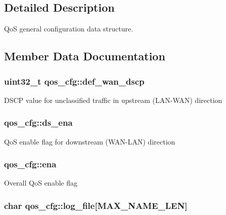 \subsection{Detailed Description}
Qo\-S general configuration data structure. 

\subsection{Member Data Documentation}
\hypertarget{structqos__cfg_aca196127a157dc22a75c9fc1a9abb124}{
\subsubsection[{def\-\_\-wan\-\_\-dscp}]{\setlength{\rightskip}{0pt plus 5cm}uint32\-\_\-t qos\-\_\-cfg\-::def\-\_\-wan\-\_\-dscp}}\label{structqos__cfg_aca196127a157dc22a75c9fc1a9abb124}
D\-S\-C\-P value for unclassified traffic in upstream (L\-A\-N-\/\-W\-A\-N) direction \hypertarget{structqos__cfg_a59c290fbf8b95e2f08674c8d3565531d}{
\subsubsection[{ds\-\_\-ena}]{ qos\-\_\-cfg\-::ds\-\_\-ena}}\label{structqos__cfg_a59c290fbf8b95e2f08674c8d3565531d}
Qo\-S enable flag for downstream (W\-A\-N-\/\-L\-A\-N) direction \hypertarget{structqos__cfg_a249977e1be92f8e9725e755a52065828}{
\subsubsection[{ena}]{ qos\-\_\-cfg\-::ena}}\label{structqos__cfg_a249977e1be92f8e9725e755a52065828}
Overall Qo\-S enable flag \hypertarget{structqos__cfg_aafe2164e01390853b819a90181ca1c22}{
\subsubsection[{log\-\_\-file}]{\setlength{\rightskip}{0pt plus 5cm}char qos\-\_\-cfg\-::log\-\_\-file\mbox{[}{\bf M\-A\-X\-\_\-\-N\-A\-M\-E\-\_\-\-L\-E\-N}\mbox{]}}}\label{structqos__cfg_aafe2164e01390853b819a90181ca1c22}
